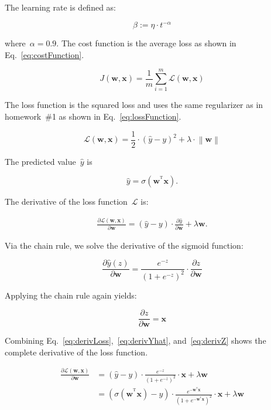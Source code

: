 \documentclass{report}
\newcommand{\norm}[1]{\left\lVert#1\right\rVert}
\newcommand{\T}{^\textrm{T}}
\begin{document}
  \noindent
  The learning rate is defined as:
  
  \[\beta := \eta \cdot t^{-\alpha} \]
  
  \noindent
  where~$\alpha=0.9$.  The cost function is the average loss as shown in Eq.~\eqref{eq:costFunction}.
 
  \begin{equation}
    J(\mathbf{w}, \mathbf{x}) = \frac{1}{m}\sum_{i=1}^{m} \mathcal{L}(\mathbf{w},\mathbf{x})
    \label{eq:costFunction}
  \end{equation}
  
  \noindent
  The loss function is the squared loss and uses the same regularizer as in homework~\#1 as shown in Eq.~\eqref{eq:lossFunction}.
  
  \begin{equation}
    \mathcal{L}(\mathbf{w},\mathbf{x}) = \frac{1}{2}\cdot(\hat{y} - y)^2 + \lambda \cdot \norm{\mathbf{w}}
    \label{eq:lossFunction}
  \end{equation}
  
  \noindent
  The predicted value~$\hat{y}$ is 
  
  \[\hat{y} = \sigma   (\mathbf{w}^{\T}\mathbf{x}) \textrm{.} \]

  The derivative of the loss function~$\mathcal{L}$ is:
  
  \begin{align}
    \frac{\partial \mathcal{L}(\mathbf{w}, \mathbf{x})}{\partial \mathbf{w}} = (\hat{y} - y) \cdot \frac{\partial \hat{y}}{\partial \mathbf{w}} + \lambda \mathbf{w} \textrm{.}
    \label{eq:derivLoss}
  \end{align}

  \noindent
  Via the chain rule, we solve the derivative of the sigmoid function:
  
  \begin{equation}
    \frac{\partial \hat{y}(z)}{\partial \mathbf{w}} = \frac{e^{-z}}{(1+e^{-z})^{2}} \cdot \frac{\partial z}{\partial \mathbf{w}}
    \label{eq:derivYhat}
  \end{equation}

  \noindent
  Applying the chain rule again yields:
  
  \begin{equation}
    \frac{\partial z}{\partial \mathbf{w}} = \mathbf{x}
    \label{eq:derivZ}
  \end{equation}

  \noindent
  Combining Eq.~\eqref{eq:derivLoss},~\eqref{eq:derivYhat}, and~\eqref{eq:derivZ} shows the complete derivative of the loss function.
  
  \begin{align}
    \frac{\partial \mathcal{L}(\mathbf{w}, \mathbf{x})}{\partial \mathbf{w}} &= (\hat{y} - y) \cdot \frac{e^{-z}}{(1+e^{-z})^{2}} \cdot \mathbf{x} + \lambda \mathbf{w}\\
    &= (\sigma(\mathbf{w}^{\T} \mathbf{x}) - y) \cdot \frac{e^{-\mathbf{w}^{\T} \mathbf{x}}}{(1+e^{-\mathbf{w}^{\T} \mathbf{x}})^{2}} \cdot \mathbf{x} + \lambda \mathbf{w}
  \end{align}  
\end{document}
